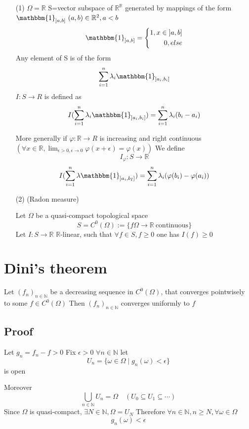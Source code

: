 \documentclass{book}
\newcommand{\rightbracket}{]}
\begin{document}
\begin{itemize}
    \item [(1)]$\Omega=\mathbb{R}$ S=vector subspace of $\mathbb{R}^\mathbb{R}$ generated by mappings of the form $\mathbbm{1}_{{\rightbracket a,b\rightbracket}}\ (a,b)\in \mathbb{R}^2,a<b$
    $$\mathbbm{1}_{{\rightbracket a,b\rightbracket}}=\left\{\begin{aligned}
        1,x\in {\rightbracket a,b\rightbracket}\\ 0, else
    \end{aligned}\right.$$
    Any element of S is of the form$$\sum\limits_{i=1}^n\lambda_i\mathbbm{1}_{\rightbracket a_i,b_i\rightbracket}$$
    $I:S\rightarrow R$ is defined as $$I(\sum\limits_{i=1}^n\lambda_i\mathbbm{1}_{\rightbracket a_i,b_i\rightbracket})=\sum\limits_{i=1}^n\lambda_i(b_i-a_i)$$

    More generally if $\varphi:\mathbb{R}\rightarrow R$ is increasing and right continuous $(\forall x\in \mathbb{R},\lim_{\epsilon>0,\epsilon\rightarrow 0}\varphi(x+\epsilon)=\varphi(x))$
    We define $$I_\varphi:S\rightarrow\mathbb{R}$$
    $$I(\sum\limits_{i=1}^n\lambda\mathbbm{1}_{\rightbracket a_i,b_I\rightbracket})=\sum\limits_{i=1}^n\lambda_i(\varphi(b_i)-\varphi(a_i))$$
    \item [(2)](Radon measure)
    
    Let $\Omega$ be a quasi-compact topological space 
    $$S=C^0(\Omega):=\{f\Omega\rightarrow\mathbb{R}\ \text{continuous}\}$$
    Let $I:S\rightarrow\mathbb{R}$ $\mathbb{R}$-linear, such that $\forall f\in S,f\geq 0$ one has $I(f)\geq 0$
\end{itemize}
\section{Dini's theorem}
Let $(f_n)_{n\in \mathbb{N}}$ be a decreasing sequence in $C^0(\Omega)$, that converges pointwisely to some $f\in C^0(\Omega)$ Then $(f_n)_{n\in \mathbb{N}}$ converges uniformly to $f$
\subsection*{Proof}
Let $g_n=f_n-f>0$
Fix $\epsilon>0$ $\forall n\in \mathbb{N}$ let $$U_n=\{\omega\in \Omega\mid g_n(\omega)<\epsilon\}$$ is open 

Moreover $$\bigcup\limits_{n\in \mathbb{N}}U_n=\Omega\quad (U_0\subseteq U_1\subseteq\cdots)$$
Since $\Omega$ is quasi-compact, $\exists N\in \mathbb{N},\Omega=U_N$
Therefore $\forall n\in \mathbb{N},n\geq N, \forall \omega\in \Omega$$$g_n(\omega)<\epsilon$$
\end{document}
